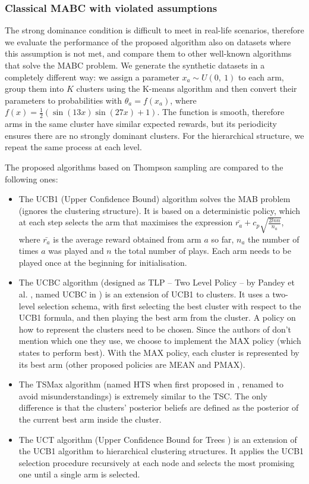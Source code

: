 \subsubsection{Classical MABC with violated assumptions}

The strong dominance condition is difficult to meet in real-life scenarios, therefore we evaluate the performance of the proposed algorithm also on datasets where this assumption is not met, and compare them to other well-known algorithms that solve the MABC problem. We generate the synthetic datasets in a completely different way: we assign a parameter $x_a \sim U(0,\ 1)$ to each arm, group them into $K$ clusters using the K-means algorithm and then convert their parameters to probabilities with $\theta_a = f(x_a)$, where $f(x) = \frac{1}{2} (\sin{(13x)} \sin{(27x)} + 1)$. The function is smooth, therefore arms in the same cluster have similar expected rewards, but its periodicity ensures there are no strongly dominant clusters. For the hierarchical structure, we repeat the same process at each level.

The proposed algorithms based on Thompson sampling are compared to the following ones:

\begin{itemize}
  \item The UCB1 \cite{auer} (Upper Confidence Bound) algorithm solves the MAB problem (ignores the clustering structure). It is based on a deterministic policy, which at each step selects the arm that maximises the expression $\bar{r_a} + c_p \sqrt{\frac{2 ln n}{n_a}}$, where $\bar{r_a}$ is the average reward obtained from arm $a$ so far, $n_a$ the number of times $a$ was played and $n$ the total number of plays. Each arm needs to be played once at the beginning for initialisation.
  \item The UCBC algorithm (designed as TLP -- Two Level Policy -- by Pandey et al. \cite{pandey}, named UCBC in \cite{bouneffouf}) is an extension of UCB1 to clusters. It uses a two-level selection schema, with first selecting the best cluster with respect to the UCB1 formula, and then playing the best arm from the cluster. A policy on how to represent the clusters need to be chosen. Since the authors of \cite{bandits} don't mention which one they use, we choose to implement the MAX policy (which \cite{pandey} states to perform best). With the MAX policy, each cluster is represented by its best arm (other proposed policies are MEAN and PMAX).
  \item The TSMax algorithm (named HTS when first proposed in \cite{zhao}, renamed to avoid misunderstandings) is extremely similar to the TSC. The only difference is that the clusters' posterior beliefs are defined as the posterior of the current best arm inside the cluster.
  \item The UCT algorithm (Upper Confidence Bound for Trees \cite{kocsis}) is an extension of the UCB1 algorithm to hierarchical clustering structures. It applies the UCB1 selection procedure recursively at each node and selects the most promising one until a single arm is selected.
\end{itemize}

